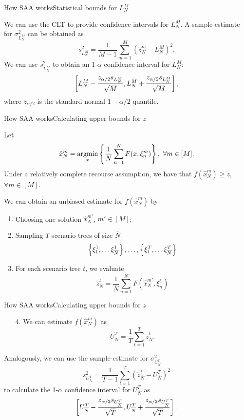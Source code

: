 \begin{frame}{How SAA works}{Statistical bounds for $L_N^M$}

	We can use the CLT to provide \alert{confidence intervals} for $L_N^M$. A sample-estimate for $\sigma^2_{L_N^M}$ can be obtained as 
	$$
		s^2_{L_N^M} = \frac{1}{M-1}	\sum_{m=1}^M (\hat{z}^m_N - L_N^M)^2.
	$$
	\pause
	We can use $s^2_{L_N^M}$ to obtain an  \alert{1-$\alpha$ confidence interval} for $L_N^M$:
	$$
		\left[ L_N^M - \frac{z_{\alpha/2} s_{L_N^M}}{\sqrt{M}}, L_N^M + \frac{z_{\alpha/2} s_{L_N^M}}{\sqrt{M}} \right],
	$$
	where $z_{\alpha/2}$ is the standard normal $1-\alpha/2$ quantile.
	
\end{frame}


\begin{frame}{How SAA works}{Calculating upper bounds for $z$}

	Let 
	$$
		\hat{x}^m_N = \mathop{\rm argmin}_x\left\{ \frac{1}{N}\sum_{n=1}^{N}F(x, \xi_n^m) \right \}, \ \forall m \in [M].
	$$
	Under a relatively complete recourse assumption, we have that $f(\hat{x}^m_N) \ge z$, $\forall m \in [M]$. 
	
	\pause 
	We can obtain an unbiased estimate for \alert{$f(\hat{x}^m_N)$} by
	\begin{enumerate}
		\item \alert{Choosing} one solution $\hat{x}^{m'}_N$, $m' \in [M]$;
		\item Sampling $T$ scenario trees of size $\overline{N}$
		$$
			\left\{ \xi_1^1, \dots \xi_{\overline{N}}^1 \right \}, \dots, \left\{ \xi_1^T, \dots \xi_{\overline{N}}^T \right \}
		$$
		\item For each scenario tree $t$, we evaluate
		\vspace{-3pt}
		$$
			\check{z}_{\overline{N}}^t = \frac{1}{\overline{N}} \sum_{n=1}^{\overline{N}} F(\hat{x}^{m'}_N, \xi_n^t)
		$$
	\end{enumerate}
	
\end{frame}


\begin{frame}{How SAA works}{Calculating upper bounds for $z$}

	\begin{enumerate}
		\item[4.] We can estimate $f(\hat{x}^m_N)$ as
		\begin{equation*}
			U_{\overline{N}}^T = \frac{1}{T} \sum_{t=1}^T \check{z}_{\overline{N}}^t.
		\end{equation*}
	\end{enumerate}
	
	Analogously, we can use the sample-estimate for $\sigma_{U_{\overline{N}}^T}^2$
	$$
		s^2_{U_{\overline{N}}^T} = \frac{1}{T-1}	\sum_{t=1}^T (\check{z}_{\overline{N}}^t - U_{\overline{N}}^T)^2
	$$
	to calculate the \alert{1-$\alpha$ confidence interval} for $U_{\overline{N}}^T$ as
	$$
		\left[ U_{\overline{N}}^T - \frac{z_{\alpha/2} s_{U_{\overline{N}}^T}}{\sqrt{T}}, U_{\overline{N}}^T + \frac{z_{\alpha/2} s_{U_{\overline{N}}^T}}{\sqrt{T}} \right].
	$$
	
\end{frame}


